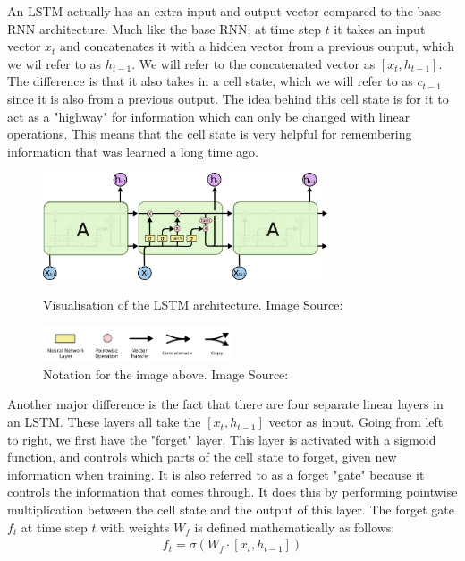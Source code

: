 \noindent
An LSTM actually has an extra input and output vector compared to the base RNN architecture. Much like the base RNN, at time step $t$ it takes an input vector $x_t$ and concatenates it with a hidden vector from a previous output, which we wil refer to as $h_{t-1}$. We will refer to the concatenated vector as $[x_t,h_{t-1}]$. The difference is that it also takes in a cell state, which we will refer to as $c_{t-1}$ since it is also from a previous output. The idea behind this cell state is for it to act as a "highway" for information which can only be changed with linear operations. This means that the cell state is very helpful for remembering information that was learned a long time ago.\\
\begin{figure}[!ht]
    \centering
        \includegraphics[width=0.75\textwidth]{latex/imgs/lstm.png}
    \caption{Visualisation of the LSTM architecture. Image Source:\cite{lstm}}
    \centering
        \includegraphics[width=0.5\textwidth]{latex/imgs/lstm_notation.png}
    \caption{Notation for the image above. Image Source:\cite{lstm}}
\end{figure}
Another major difference is the fact that there are four separate linear layers in an LSTM. These layers all take the $[x_t,h_{t-1}]$ vector as input. Going from left to right, we first have the "forget" layer. This layer is activated with a sigmoid function, and controls which parts of the cell state to forget, given new information when training. It is also referred to as a forget "gate" because it controls the information that comes through. It does this by performing pointwise multiplication between the cell state and the output of this layer. The forget gate $f_t$ at time step $t$ with weights $W_f$ is defined mathematically as follows:
\begin{align}
    f_t = \sigma (W_f \cdot [x_t,h_{t-1}])
\end{align}

